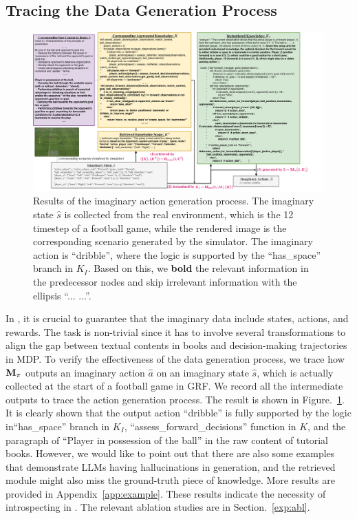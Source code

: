 \subsection{Tracing the Data Generation Process}

\begin{figure}[h]
    \hspace{-9mm}
    \includegraphics[width=1.2\textwidth]{fig/example2.pdf}
    \caption{Results of the imaginary action generation process. The imaginary state $\hat s$ is collected from the real environment, which is the 12 timestep of a football game, while the rendered image is the corresponding scenario generated by the simulator. The imaginary action is ``dribble'', where the logic is supported by the ``has\_space'' branch in $K_I$. Based on this, we \textbf{bold} the relevant information in the predecessor nodes and skip irrelevant information with the ellipsis ``... ...''.}
    \label{fig:data_gen_demo}
    \vspace{-1mm}
\end{figure}
In \algo, it is crucial to guarantee that the imaginary data include states, actions, and rewards. The task is non-trivial since it has to involve several transformations to align the gap between textual contents in books and decision-making trajectories in MDP. To verify the effectiveness of the data generation process, we trace how $\mathbf{M}_\pi$ outputs an imaginary action $\hat a$ on an imaginary state $\hat s$, which is actually collected at the start of a football game in GRF. We record all the intermediate outputs to trace the action generation process. The result is shown in Figure.~\ref{fig:data_gen_demo}.   It is clearly shown that the output action ``dribble'' is fully supported by the logic in``has\_space'' branch in $K_I$, ``assess\_forward\_decisions'' function in $K$, and the paragraph of ``Player in possession of the ball'' in the raw content of tutorial books. However, we would like to point out that there are also some examples that demonstrate LLMs having hallucinations in generation, and the retrieved module might also miss the ground-truth piece of knowledge. More results are provided in Appendix~\ref{app:example}. These results indicate the necessity of introspecting in \algo. The relevant ablation studies are in Section.~\ref{exp:abl}.


